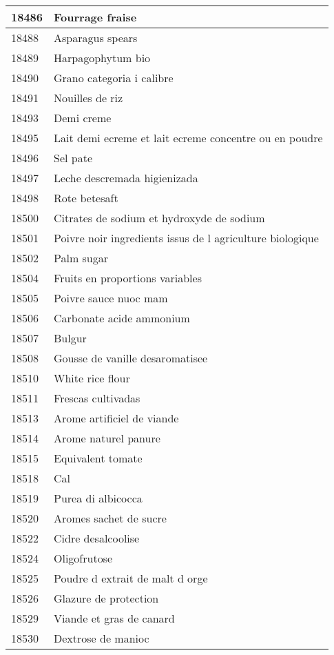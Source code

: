 \begin{longtable}{|l|l|}
18486 & Fourrage fraise \\ \hline 
18488 & Asparagus spears \\ \hline 
18489 & Harpagophytum bio \\ \hline 
18490 & Grano categoria i calibre \\ \hline 
18491 & Nouilles de riz \\ \hline 
18493 & Demi creme \\ \hline 
18495 & Lait demi ecreme et lait ecreme concentre ou en poudre \\ \hline 
18496 & Sel pate \\ \hline 
18497 & Leche descremada higienizada \\ \hline 
18498 & Rote betesaft \\ \hline 
18500 & Citrates de sodium et hydroxyde de sodium \\ \hline 
18501 & Poivre noir ingredients issus de l agriculture biologique \\ \hline 
18502 & Palm sugar \\ \hline 
18504 & Fruits en proportions variables \\ \hline 
18505 & Poivre sauce nuoc mam \\ \hline 
18506 & Carbonate acide ammonium \\ \hline 
18507 & Bulgur \\ \hline 
18508 & Gousse de vanille desaromatisee \\ \hline 
18510 & White rice flour \\ \hline 
18511 & Frescas cultivadas \\ \hline 
18513 & Arome artificiel de viande \\ \hline 
18514 & Arome naturel panure \\ \hline 
18515 & Equivalent tomate \\ \hline 
18518 & Cal \\ \hline 
18519 & Purea di albicocca \\ \hline 
18520 & Aromes sachet de sucre \\ \hline 
18522 & Cidre desalcoolise \\ \hline 
18524 & Oligofrutose \\ \hline 
18525 & Poudre d extrait de malt d orge \\ \hline 
18526 & Glazure de protection \\ \hline 
18529 & Viande et gras de canard \\ \hline 
18530 & Dextrose de manioc \\ \hline 

\end{longtable}

